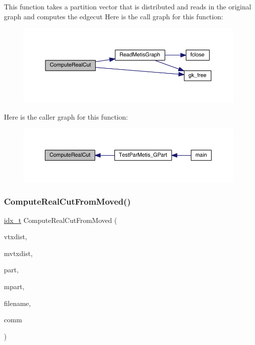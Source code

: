 This function takes a partition vector that is distributed and reads in the original graph and computes the edgecut Here is the call graph for this function\+:\nopagebreak
\begin{figure}[H]
\begin{center}
\leavevmode
\includegraphics[width=350pt]{a00437_a725d56a999dc467b3f7883eea465bab2_cgraph}
\end{center}
\end{figure}
Here is the caller graph for this function\+:\nopagebreak
\begin{figure}[H]
\begin{center}
\leavevmode
\includegraphics[width=350pt]{a00437_a725d56a999dc467b3f7883eea465bab2_icgraph}
\end{center}
\end{figure}
\mbox{\label{a00437_a8003a74d9258bf251cc16e3b964c4b69}} 
\subsubsection{\texorpdfstring{Compute\+Real\+Cut\+From\+Moved()}{ComputeRealCutFromMoved()}}
{\footnotesize\ttfamily \hyperlink{a00876_aaa5262be3e700770163401acb0150f52}{idx\+\_\+t} Compute\+Real\+Cut\+From\+Moved (\begin{DoxyParamCaption}\item[{\hyperlink{a00876_aaa5262be3e700770163401acb0150f52}{idx\+\_\+t} $\ast$}]{vtxdist,  }\item[{\hyperlink{a00876_aaa5262be3e700770163401acb0150f52}{idx\+\_\+t} $\ast$}]{mvtxdist,  }\item[{\hyperlink{a00876_aaa5262be3e700770163401acb0150f52}{idx\+\_\+t} $\ast$}]{part,  }\item[{\hyperlink{a00876_aaa5262be3e700770163401acb0150f52}{idx\+\_\+t} $\ast$}]{mpart,  }\item[{char $\ast$}]{filename,  }\item[{M\+P\+I\+\_\+\+Comm}]{comm }\end{DoxyParamCaption})}

